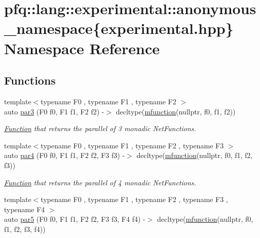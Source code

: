 \hypertarget{namespacepfq_1_1lang_1_1experimental_1_1anonymous__namespace_02experimental_8hpp_03}{\section{pfq\+:\+:lang\+:\+:experimental\+:\+:anonymous\+\_\+namespace\{experimental.\+hpp\} Namespace Reference}
\label{namespacepfq_1_1lang_1_1experimental_1_1anonymous__namespace_02experimental_8hpp_03}
}
\subsection*{Functions}
\begin{DoxyCompactItemize}
\item 
{\footnotesize template$<$typename F0 , typename F1 , typename F2 $>$ }\\auto \hyperlink{namespacepfq_1_1lang_1_1experimental_1_1anonymous__namespace_02experimental_8hpp_03_af0108af83829c1c694d3ae5c4bd26f3a}{par3} (F0 f0, F1 f1, F2 f2) -\/$>$ decltype(\hyperlink{namespacepfq_1_1lang_a1aacba4a159b6c2ddf275bd1fec19ec2}{mfunction}(nullptr, f0, f1, f2))
\begin{DoxyCompactList}\small\item\em \hyperlink{structpfq_1_1lang_1_1Function}{Function} that returns the parallel of 3 monadic Net\+Functions. \end{DoxyCompactList}\item 
{\footnotesize template$<$typename F0 , typename F1 , typename F2 , typename F3 $>$ }\\auto \hyperlink{namespacepfq_1_1lang_1_1experimental_1_1anonymous__namespace_02experimental_8hpp_03_a92b83aab5acfe9275fa26cf76792cb4f}{par4} (F0 f0, F1 f1, F2 f2, F3 f3) -\/$>$ decltype(\hyperlink{namespacepfq_1_1lang_a1aacba4a159b6c2ddf275bd1fec19ec2}{mfunction}(nullptr, f0, f1, f2, f3))
\begin{DoxyCompactList}\small\item\em \hyperlink{structpfq_1_1lang_1_1Function}{Function} that returns the parallel of 4 monadic Net\+Functions. \end{DoxyCompactList}\item 
{\footnotesize template$<$typename F0 , typename F1 , typename F2 , typename F3 , typename F4 $>$ }\\auto \hyperlink{namespacepfq_1_1lang_1_1experimental_1_1anonymous__namespace_02experimental_8hpp_03_accd053b3bd5c203048a7bd124a504d64}{par5} (F0 f0, F1 f1, F2 f2, F3 f3, F4 f4) -\/$>$ decltype(\hyperlink{namespacepfq_1_1lang_a1aacba4a159b6c2ddf275bd1fec19ec2}{mfunction}(nullptr, f0, f1, f2, f3, f4))

\end{DoxyCompactItemize}
